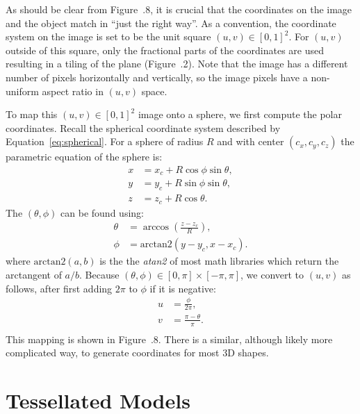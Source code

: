 As should be clear from Figure~\thechapter.8, it is crucial that
the coordinates on the image and the object match in ``just the right way''.
As a convention, the coordinate system on the image is set to
be the unit square $(u,v) \in [0,1]^2$.  For $(u,v)$
outside of this square, only the fractional parts
of the coordinates are used resulting in a tiling of the
plane (Figure~\thechapter.2).  Note that the image has a different 
number of pixels horizontally and vertically, so the image pixels
have a non-uniform aspect ratio in $(u,v)$ space.

To map this $(u,v) \in [0,1]^2$ image onto a sphere,
we first compute the polar coordinates.  Recall the spherical
coordinate system
described by Equation~\ref{eq:spherical}.  For a sphere of radius $R$ and
with center $(c_x,c_y,c_z)$ the parametric equation of the sphere is:
\begin{displaymath}
\begin{split}
x &= x_c + R \cos \phi \sin \theta, \\
y &= y_c + R \sin \phi \sin \theta, \\
z &= z_c + R \cos \theta.
\end{split}
\end{displaymath}
The $(\theta,\phi)$ can be found using:
\begin{displaymath}
\begin{split}
\theta &= \arccos \left( \frac{z-z_c}{R} \right),    \\
\phi &= \text{arctan2} (y-y_c, x - x_c). 
\end{split}
\end{displaymath}
where $\text{arctan2}(a,b)$ is the the \emph{atan2} of most math libraries
which return the arctangent of $a/b$.  Because
$(\theta,\phi) \in [0,\pi]\times [-\pi,\pi]$, we convert to $(u,v)$
as follows, after first adding $2\pi$ to $\phi$ if it is negative:
\begin{displaymath}
\begin{split}
u &= \frac{\phi}{2\pi},    \\
v &= \frac{\pi-\theta}{\pi}.   \\
\end{split}
\end{displaymath}
This mapping is shown in Figure~\thechapter.8.
There is a similar, although likely more complicated way, to generate
coordinates for most 3D shapes.



\section{Tessellated Models}\label{sec:trimesh}

